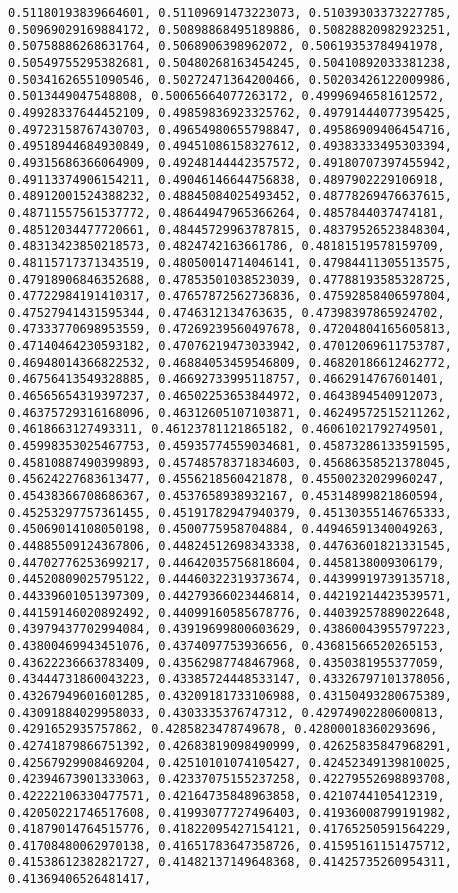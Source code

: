\documentclass[11pt]{article}
\begin{document}
\begin{Verbatim}[commandchars=\\\{\}]
0.51180193839664601, 0.51109691473223073, 0.51039303373227785, 0.50969029169884172, 0.50898868495189886, 0.50828820982923251, 0.50758886268631764, 0.5068906398962072, 0.50619353784941978, 0.50549755295382681, 0.50480268163454245, 0.50410892033381238, 0.50341626551090546, 0.50272471364200466, 0.50203426122009986, 0.5013449047548808, 0.50065664077263172, 0.49996946581612572, 0.49928337644452109, 0.49859836923325762, 0.49791444077395425, 0.49723158767430703, 0.49654980655798847, 0.49586909406454716, 0.49518944684930849, 0.49451086158327612, 0.49383333495303394, 0.49315686366064909, 0.49248144442357572, 0.49180707397455942, 0.49113374906154211, 0.49046146644756838, 0.4897902229106918, 0.48912001524388232, 0.48845084025493452, 0.48778269476637615, 0.48711557561537772, 0.48644947965366264, 0.4857844037474181, 0.48512034477720661, 0.48445729963787815, 0.48379526523848304, 0.48313423850218573, 0.4824742163661786, 0.48181519578159709, 0.48115717371343519, 0.48050014714046141, 0.47984411305513575, 0.47918906846352688, 0.47853501038523039, 0.47788193585328725, 0.47722984191410317, 0.47657872562736836, 0.47592858406597804, 0.47527941431595344, 0.4746312134763635, 0.47398397865924702, 0.47333770698953559, 0.47269239560497678, 0.47204804165605813, 0.47140464230593182, 0.47076219473033942, 0.47012069611753787, 0.46948014366822532, 0.46884053459546809, 0.46820186612462772, 0.46756413549328885, 0.46692733995118757, 0.4662914767601401, 0.46565654319397237, 0.46502253653844972, 0.4643894540912073, 0.46375729316168096, 0.46312605107103871, 0.46249572515211262, 0.4618663127493311, 0.46123781121865182, 0.46061021792749501, 0.45998353025467753, 0.45935774559034681, 0.45873286133591595, 0.45810887490399893, 0.45748578371834603, 0.45686358521378045, 0.45624227683613477, 0.4556218560421878, 0.45500232029960247, 0.45438366708686367, 0.4537658938932167, 0.45314899821860594, 0.45253297757361455, 0.45191782947940379, 0.45130355146765333, 0.45069014108050198, 0.4500775958704884, 0.44946591340049263, 0.44885509124367806, 0.44824512698343338, 0.44763601821331545, 0.44702776253699217, 0.44642035756818604, 0.4458138009306179, 0.44520809025795122, 0.44460322319373674, 0.44399919739135718, 0.44339601051397309, 0.44279366023446814, 0.44219214423539571, 0.44159146020892492, 0.44099160585678776, 0.44039257889022648, 0.43979437702994084, 0.43919699800603629, 0.43860043955797223, 0.43800469943451076, 0.4374097753936656, 0.43681566520265153, 0.43622236663783409, 0.43562987748467968, 0.4350381955377059, 0.43444731860043223, 0.43385724448533147, 0.43326797101378056, 0.43267949601601285, 0.43209181733106988, 0.43150493280675389, 0.43091884029958033, 0.4303335376747312, 0.42974902280600813, 0.4291652935757862, 0.4285823478749678, 0.42800018360293696, 0.42741879866751392, 0.42683819098490999, 0.42625835847968291, 0.42567929908469204, 0.42510101074105427, 0.42452349139810025, 0.42394673901333063, 0.42337075155237258, 0.42279552698893708, 0.42222106330477571, 0.42164735848963858, 0.4210744105412319, 0.42050221746517608, 0.41993077727496403, 0.41936008799191982, 0.41879014764515776, 0.41822095427154121, 0.41765250591564229, 0.41708480062970138, 0.41651783647358726, 0.41595161151475712, 0.41538612382821727, 0.41482137149648368, 0.41425735260954311, 0.41369406526481417, 
\end{Verbatim}
\end{document}
